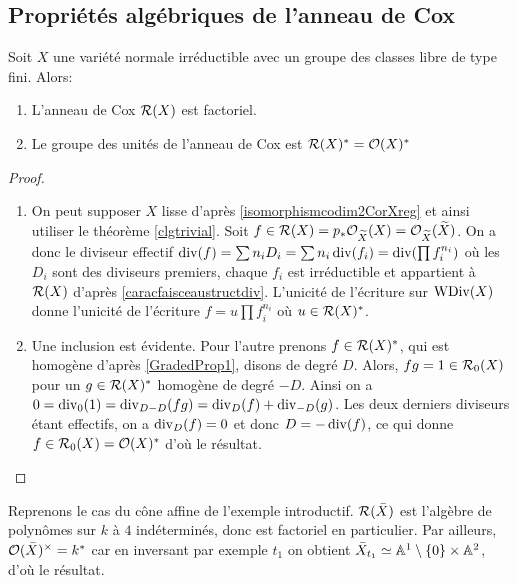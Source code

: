 \subsection{Propriétés algébriques de l'anneau de Cox}

\begin{thm}\label{coxFreeFactoriel}
Soit $X$ une variété normale irréductible avec un groupe des classes libre de type fini. Alors:
\begin{enumerate}
\item L'anneau de Cox $\mathcal{R}(X)$ est factoriel.
\item Le groupe des unités de l'anneau de Cox est $\mathcal{R}(X)^*=\mathcal{O}(X)^*$
\end{enumerate}
\end{thm}
\begin{proof}
\begin{enumerate}
\item On peut supposer $X$ lisse d'après \ref{isomorphismcodim2CorXreg} et ainsi utiliser le théorème \ref{clgtrivial}. Soit $f\in \mathcal{R}(X)=p_*\mathcal{O}_{\widetilde{X}}(X)=\mathcal{O}_{\widetilde{X}}(\widetilde{X})$. On a donc le diviseur effectif $\operatorname{div}(f)= \sum n_iD_i=\sum n_i\operatorname{div}(f_i)=\operatorname{div}(\prod f_i^{n_i})$ où les $D_i$ sont des diviseurs premiers, chaque $f_i$ est irréductible et appartient à $\mathcal{R}(X)$ d'après \ref{caracfaisceaustructdiv}. L'unicité de l'écriture sur $\operatorname{WDiv}(X)$ donne l'unicité de l'écriture $f=u\prod f_i^{n_i}$ où $u\in \mathcal{R}(X)^*$.
\item Une inclusion est évidente. Pour l'autre prenons $f\in\mathcal{R}(X)^*$, qui est homogène d'après \ref{GradedProp1}, disons de degré $D$. Alors, $fg=1\in \mathcal{R}_0(X)$ pour un $g\in\mathcal{R}(X)^*$ homogène de degré $-D$. Ainsi on a $0=\operatorname{div}_0(1)=\operatorname{div}_{D-D}(fg)=\operatorname{div}_D(f)+\operatorname{div}_{-D}(g)$. Les deux derniers diviseurs étant effectifs, on a $\operatorname{div}_D(f)=0$ et donc $D=-\operatorname{div}(f)$, ce qui donne $f\in\mathcal{R}_0(X)=\mathcal{O}(X)^*$ d'où le résultat.
\end{enumerate}
\end{proof}

\begin{ex}
Reprenons le cas du cône affine de l'exemple introductif.  $\mathcal{R}(\bar{X})$ est l'algèbre de polynômes sur $k$ à $4$ indéterminés, donc est factoriel en particulier.  Par ailleurs, $\mathcal{O}(\bar{X})^{\times}=k^*$ car en inversant par exemple $t_1$  on obtient $\bar{X}_{t_1}\simeq \mathbb{A}^{1}\setminus \lbrace0\rbrace\times\mathbb{A}^{2}$, d'où le résultat.
\end{ex}

